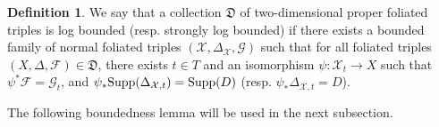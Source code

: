 \documentclass[12pt, a4paper]{amsart}
\theoremstyle{definition}
\newtheorem{definition}[theorem]{Definition}
\theoremstyle{named}
\begin{document}
\begin{definition}
    We say that a collection 
    $\mathfrak D$
    of two-dimensional proper foliated triples is 
    log bounded (resp. strongly log bounded)
    if there exists a bounded family of normal foliated triples 
    $(\mathcal X, \Delta_{\mathcal X}, \mathcal G)$
    such that for all foliated triples
    $(X, \Delta, \mathcal F) \in \mathfrak D$, 
    there exists 
    $t \in T$
    and an isomorphism
    $\psi \colon \mathcal X_t \to X$
    such that 
    $\psi^\ast \mathcal F=\mathcal G_t$, 
    and 
    $\psi_\ast {\rm Supp}(\Delta_{\mathcal X, t})={\rm Supp}(D)$
    (resp.
    $\psi_\ast \Delta_{\mathcal X, t}=D$).

\end{definition}

\iffalse
The following boundedness lemma will be used in the next subsection.
\end{document}
